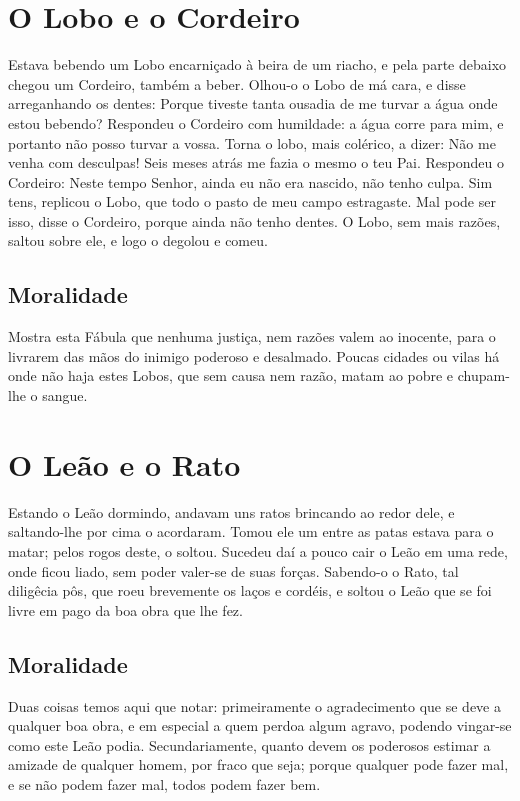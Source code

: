 \documentclass[a4paper,article]{memoir}
\begin{document}
\chapter{O Lobo e o Cordeiro}

Estava bebendo um Lobo encarniçado à beira de um riacho, e pela parte
debaixo chegou um Cordeiro, também a beber. Olhou-o o Lobo de má cara,
e disse arreganhando os dentes: Porque tiveste tanta ousadia de me
turvar a água onde estou bebendo? Respondeu o Cordeiro com humildade:
a água corre para mim, e portanto não posso turvar a vossa. Torna o
lobo, mais colérico, a dizer: Não me venha com desculpas! Seis meses
atrás me fazia o mesmo o teu Pai. Respondeu o Cordeiro: Neste tempo
Senhor, ainda eu não era nascido, não tenho culpa. Sim tens, replicou
o Lobo, que todo o pasto de meu campo estragaste. Mal pode ser isso,
disse o Cordeiro, porque ainda não tenho dentes. O Lobo, sem mais
razões, saltou sobre ele, e logo o degolou e comeu.


\section{Moralidade}

Mostra esta Fábula que nenhuma justiça, nem razões valem ao inocente,
para o livrarem das mãos do inimigo poderoso e desalmado. Poucas
cidades ou vilas há onde não haja estes Lobos, que sem causa nem
razão, matam ao pobre e chupam-lhe o sangue.

\chapter{O Leão e o Rato}

Estando o Leão dormindo, andavam uns ratos brincando ao redor dele, e
saltando-lhe por cima o acordaram. Tomou ele um entre as patas estava
para o matar; pelos rogos deste, o soltou. Sucedeu daí a pouco cair o
Leão em uma rede, onde ficou liado, sem poder valer-se de suas
forças. Sabendo-o o Rato, tal diligêcia pôs, que roeu brevemente os
laços e cordéis, e soltou o Leão que se foi livre em pago da boa obra
que lhe fez.

\section{Moralidade}

Duas coisas temos aqui que notar: primeiramente o agradecimento que se
deve a qualquer boa obra, e em especial a quem perdoa algum agravo,
podendo vingar-se como este Leão podia. Secundariamente, quanto devem
os poderosos estimar a amizade de qualquer homem, por fraco que seja;
porque qualquer pode fazer mal, e se não podem fazer mal, todos podem
fazer bem.
\end{document}
